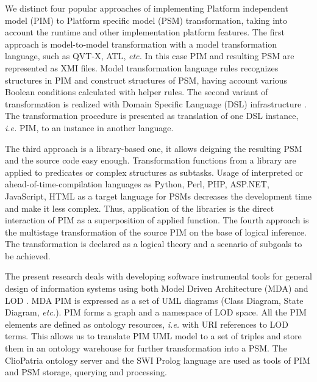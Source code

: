 \documentclass[runningheads]{llncs}
\begin{document}
We distinct four popular approaches of implementing Platform independent model (PIM) to Platform specific model (PSM) transformation, taking into account the runtime and other implementation platform features.  The first approach is model-to-model transformation with a model transformation language, such as QVT-X, ATL, \emph{etc.}  In this case PIM and resulting PSM are represented as XMI files.  Model transformation language rules recognizes structures in PIM and construct structures of PSM, having account various Boolean conditions calculated with helper rules. The second variant of transformation is realized with Domain Specific Language (DSL) infrastructure \cite{stratego}.  The transformation procedure is presented as translation of one DSL instance, \emph{i.e.} PIM, to an instance in another language.

The third approach is a library-based one, it allows deigning the resulting PSM and the source code easy enough.  Transformation functions from a library are applied to predicates or complex structures as subtasks. Usage of interpreted or ahead-of-time-compilation languages as Python, Perl, PHP, ASP.NET, JavaScript, HTML as a target language for PSMs decreases the development time and make it less complex.  Thus, application of the libraries is the direct interaction of PIM as a superposition of applied function.  The fourth approach is the multistage transformation of the source PIM \cite{tereh1} on the base of logical inference.  The transformation is declared as a logical theory and a scenario of subgoals to be achieved.

The present research deals with developing software instrumental tools for general design of information systems using both Model Driven Architecture (MDA) and LOD \cite{MDA}.  MDA PIM is expressed as a set of UML diagrams (Class Diagram, State Diagram, \emph{etc.}).  PIM forms a graph and a namespace of LOD space.  All the PIM elements are defined as ontology resources, \emph{i.e.} with URI references to LOD terms.  This allows us to translate PIM UML model to a set of triples and store them in an ontology warehouse for further transformation into a PSM. %
The ClioPatria ontology server and the SWI Prolog language \cite{Clio} are used as tools of PIM and PSM storage, querying and processing.
\end{document}
